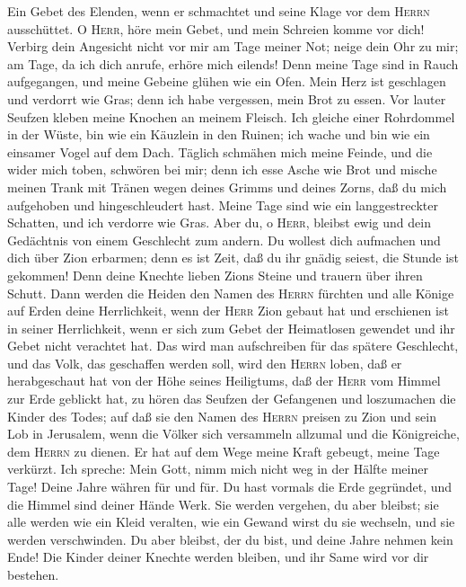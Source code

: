  Ein Gebet des Elenden, wenn er schmachtet und seine Klage
vor dem \textsc{Herrn} ausschüttet. O \textsc{Herr}, höre mein Gebet,
und mein Schreien komme vor dich!  Verbirg dein Angesicht
nicht vor mir am Tage meiner Not; neige dein Ohr zu mir; am Tage, da ich
dich anrufe, erhöre mich eilends!  Denn meine Tage sind in
Rauch aufgegangen, und meine Gebeine glühen wie ein Ofen. 
Mein Herz ist geschlagen und verdorrt wie Gras; denn ich habe vergessen,
mein Brot zu essen.  Vor lauter Seufzen kleben meine
Knochen an meinem Fleisch.  Ich gleiche einer Rohrdommel
in der Wüste, bin wie ein Käuzlein in den Ruinen;  ich
wache und bin wie ein einsamer Vogel auf dem Dach. 
Täglich schmähen mich meine Feinde, und die wider mich toben, schwören
bei mir;  denn ich esse Asche wie Brot und mische meinen
Trank mit Tränen  wegen deines Grimms und deines Zorns,
daß du mich aufgehoben und hingeschleudert hast.  Meine
Tage sind wie ein langgestreckter Schatten, und ich verdorre wie Gras.
 Aber du, o \textsc{Herr}, bleibst ewig und dein
Gedächtnis von einem Geschlecht zum andern.  Du wollest
dich aufmachen und dich über Zion erbarmen; denn es ist Zeit, daß du ihr
gnädig seiest, die Stunde ist gekommen!  Denn deine
Knechte lieben Zions Steine und trauern über ihren Schutt.
 Dann werden die Heiden den Namen des \textsc{Herrn}
fürchten und alle Könige auf Erden deine Herrlichkeit, 
wenn der \textsc{Herr} Zion gebaut hat und erschienen ist in seiner
Herrlichkeit,  wenn er sich zum Gebet der Heimatlosen
gewendet und ihr Gebet nicht verachtet hat.  Das wird man
aufschreiben für das spätere Geschlecht, und das Volk, das geschaffen
werden soll, wird den \textsc{Herrn} loben,  daß er
herabgeschaut hat von der Höhe seines Heiligtums, daß der \textsc{Herr}
vom Himmel zur Erde geblickt hat,  zu hören das Seufzen
der Gefangenen und loszumachen die Kinder des Todes;  auf
daß sie den Namen des \textsc{Herrn} preisen zu Zion und sein Lob in
Jerusalem,  wenn die Völker sich versammeln allzumal und
die Königreiche, dem \textsc{Herrn} zu dienen.  Er hat
auf dem Wege meine Kraft gebeugt, meine Tage verkürzt. 
Ich spreche: Mein Gott, nimm mich nicht weg in der Hälfte meiner Tage!
Deine Jahre währen für und für.  Du hast vormals die Erde
gegründet, und die Himmel sind deiner Hände Werk.  Sie
werden vergehen, du aber bleibst; sie alle werden wie ein Kleid
veralten, wie ein Gewand wirst du sie wechseln, und sie werden
verschwinden.  Du aber bleibst, der du bist, und deine
Jahre nehmen kein Ende!  Die Kinder deiner Knechte werden
bleiben, und ihr Same wird vor dir bestehen.

